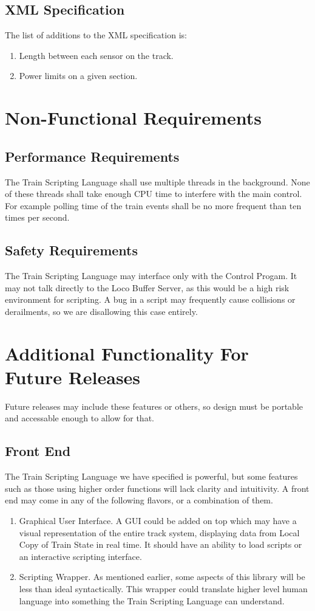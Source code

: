 \documentclass[a4paper,11pt,notitlepage]{article}
\def\TSL{Train Scripting Language\xspace}
\def\CS{Control Progam\xspace}
\def\LC{Local Copy of Train State\xspace}
\begin{document}
\subsection{XML Specification}
    The list of additions to the XML specification is:
\begin{enumerate}
    \item Length between each sensor on the track.
    \item Power limits on a given section.
\end{enumerate}

\newpage
\section{Non-Functional Requirements}
\subsection{Performance Requirements}
The \TSL shall use multiple threads in the background. None of these threads shall take enough CPU time to interfere with the main control. For example polling time of the train events shall be no more frequent than ten times per second.
\subsection{Safety Requirements}
The \TSL may interface only with the \CS. It may not talk directly to the Loco Buffer Server, as this would be a high risk environment for scripting. A bug in a script may frequently cause collisions or derailments, so we are disallowing this case entirely.

\newpage
\section{Additional Functionality For Future Releases}
Future releases may include these features or others, so design must be portable and accessable enough to allow for that.
\subsection{Front End}
The \TSL we have specified is powerful, but some features such as those using higher order functions will lack clarity and intuitivity. A front end may come in any of the following flavors, or a combination of them.
\begin{enumerate}
    \item Graphical User Interface. A GUI could be added on top which may have a visual representation of the entire track system, displaying data from \LC in real time. It should have an ability to load scripts or an interactive scripting interface.
    \item Scripting Wrapper. As mentioned earlier, some aspects of this library will be less than ideal syntactically. This wrapper could translate higher level human language into something the \TSL can understand.
\end{enumerate}
\end{document}

